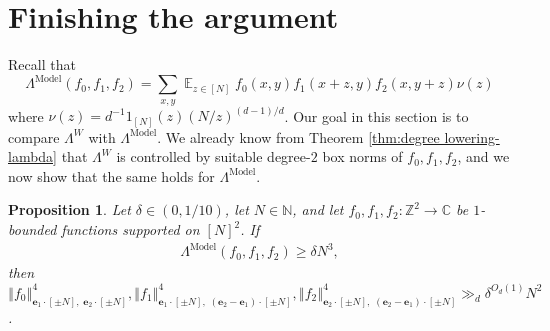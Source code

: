 \documentclass[11pt]{amsart}
\newtheorem{proposition}[lemma]{Proposition}
\theoremstyle{definition}
\DeclareMathOperator*{\E}{\mathbb{E}}
\newcommand{\C}{{\mathbb C}}
\newcommand{\N}{{\mathbb N}}
\newcommand{\Z}{{\mathbb Z}}
\newcommand{\be}{{\mathbf{e}}}
\newcommand{\norm}[1]{\left\Vert #1\right\Vert}
\newcommand{\model}{{\mathrm{Model}}}
\begin{document}
\section{Finishing the argument}\label{S: finishing}

Recall that
$$\Lambda^{\mathrm{Model}}(f_0, f_1, f_2) = \sum_{x, y} \E_{z \in [N]} f_0(x, y)f_1(x + z, y) f_2(x, y + z)\nu(z)$$
where $\nu(z) = d^{-1} 1_{[N]}(z) (N/z)^{(d-1)/d}$.  Our goal in this section is to compare $\Lambda^W$ with $\Lambda^{\model}$. We already know from Theorem \ref{thm:degree lowering-lambda} that $\Lambda^W$ is controlled by suitable degree-$2$ box norms of $f_0, f_1, f_2$, and we now show that the same holds for $\Lambda^\model.$ 
\begin{proposition}\label{P: box norm control of model}
    Let $\delta\in(0, 1/10)$, let $N\in\N$, and let $f_0, f_1, f_2:\Z^2\to\C$ be $1$-bounded functions supported on $[N]^2$. If 
    \begin{align}\label{E: lower bound for model}
        \Lambda^{\model}(f_0, f_1, f_2)\geq \delta N^3,
    \end{align}
    then $\norm{f_0}^4_{\be_1\cdot[\pm N],\; \be_2\cdot[\pm N]}, \norm{f_1}^4_{\be_1\cdot[\pm N],\; (\be_2-\be_1)\cdot[\pm N]}, \norm{f_2}^4_{\be_2\cdot[\pm N],\; (\be_2-\be_1)\cdot[\pm N]}\gg_d \delta^{O_d(1)} N^2$.
\end{proposition}
\end{document}
